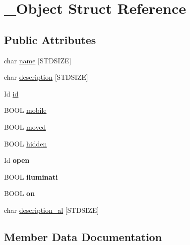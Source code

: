 \hypertarget{struct__Object}{}\section{\+\_\+\+Object Struct Reference}
\label{struct__Object}
\subsection*{Public Attributes}
\begin{DoxyCompactItemize}
\item 
char \hyperlink{struct__Object_a5f13167436f75d12f48d3f152ce91d0a}{name} \mbox{[}S\+T\+D\+S\+I\+ZE\mbox{]}
\item 
char \hyperlink{struct__Object_a4797c28bbea5a64792ec85433ee7215e}{description} \mbox{[}S\+T\+D\+S\+I\+ZE\mbox{]}
\item 
Id \hyperlink{struct__Object_a3cff7a0e8dc4e9d23895ed9af1b7653a}{id}
\item 
B\+O\+OL \hyperlink{struct__Object_a95dd9ff00e5d341b5be3bc3a5bf1ee9a}{mobile}
\item 
B\+O\+OL \hyperlink{struct__Object_a584096c8e43f53884aa7216505cc0e89}{moved}
\item 
B\+O\+OL \hyperlink{struct__Object_a44824966fc9f4d5f82c189b2e063ddc4}{hidden}
\item 
\mbox{\label{struct__Object_a0922dd9891e6aa617ce1d51ae27c0175}} 
Id {\bfseries open}
\item 
\mbox{\label{struct__Object_aac8af0a2662396bd255273a3cc8f22d7}} 
B\+O\+OL {\bfseries iluminati}
\item 
\mbox{\label{struct__Object_a325dedec5324e588d2a86e7ffa478350}} 
B\+O\+OL {\bfseries on}
\item 
char \hyperlink{struct__Object_ac438e34e4ae95415af05464dd0db29b8}{description\+\_\+al} \mbox{[}S\+T\+D\+S\+I\+ZE\mbox{]}
\end{DoxyCompactItemize}


\subsection{Member Data Documentation}
\mbox{\label{struct__Object_a4797c28bbea5a64792ec85433ee7215e}} 
